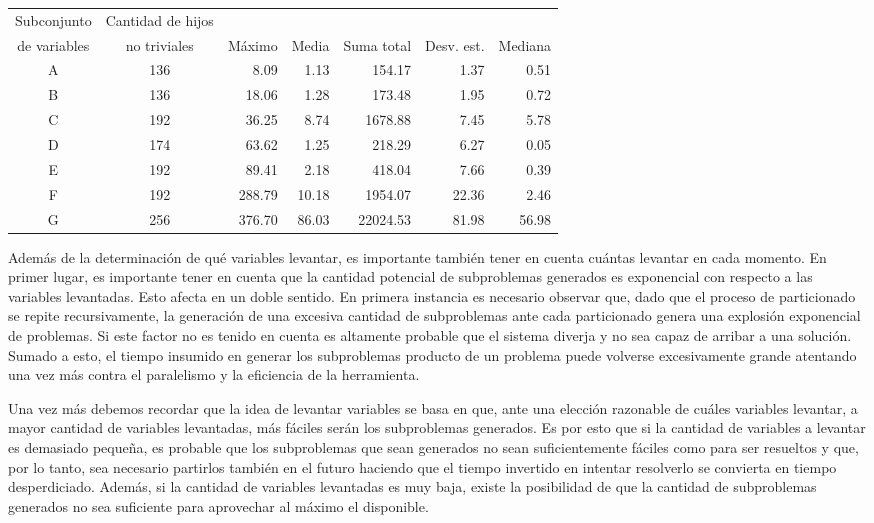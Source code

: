 \begin{tabular}{|c|c|r|r|r|r|r|}
\hline
Subconjunto & Cantidad de hijos & & & & & \\
de variables & no triviales & M\'aximo & Media & Suma total & Desv.
est. & Mediana \\
\hline
A 	& 136 	& 8.09 		& 1.13 		& 154.17	 	& 1.37 		& 0.51 \\
B 	& 136 	& 18.06 		& 1.28 		& 173.48	 	& 1.95 		& 0.72 \\
C 	& 192 	& 36.25 		& 8.74 		& 1678.88 	& 7.45 		& 5.78 \\
D	& 174 	& 63.62 		& 1.25 		& 218.29	 	& 6.27 		& 0.05 \\
E	& 192 	& 89.41 		& 2.18 		& 418.04	 	& 7.66 		& 0.39 \\
F 	& 192 	& 288.79	 	& 10.18 		& 1954.07 	& 22.36 		& 2.46 \\
G 	& 256 	& 376.70	 	& 86.03 		& 22024.53 	& 81.98 		& 56.98 \\
\hline
\end{tabular}

Además de la determinación de qué variables levantar, es importante también
tener en cuenta cuántas levantar en cada momento. En primer lugar, es
importante tener en cuenta que la cantidad potencial de subproblemas generados
es exponencial con respecto a las variables levantadas. Esto afecta en un
doble sentido. En primera instancia es necesario observar que, dado que el
proceso de particionado se repite recursivamente, la generación de una
excesiva cantidad de subproblemas ante cada particionado genera una explosión
exponencial de problemas. Si este factor no es tenido en cuenta es altamente
probable que el sistema diverja y no sea capaz de arribar a una solución.
Sumado a esto, el tiempo insumido en generar los subproblemas producto de un
problema puede volverse excesivamente grande atentando una vez más contra el
paralelismo y la eficiencia de la herramienta.

Una vez más debemos recordar que la idea de levantar variables se basa en que,
ante una elección razonable de cuáles variables levantar, a mayor cantidad de
variables levantadas, más fáciles serán los subproblemas generados. Es por
esto que si la cantidad de variables a levantar es demasiado pequeña, es
probable que los subproblemas que sean generados no sean suficientemente 
fáciles como para ser resueltos y que, por lo tanto, sea necesario partirlos también en el
futuro haciendo que el tiempo invertido en intentar resolverlo se convierta en
tiempo desperdiciado. Además, si la cantidad de variables levantadas es muy
baja, existe la posibilidad de que la cantidad de subproblemas generados no
sea suficiente para aprovechar al máximo el \hard disponible.

